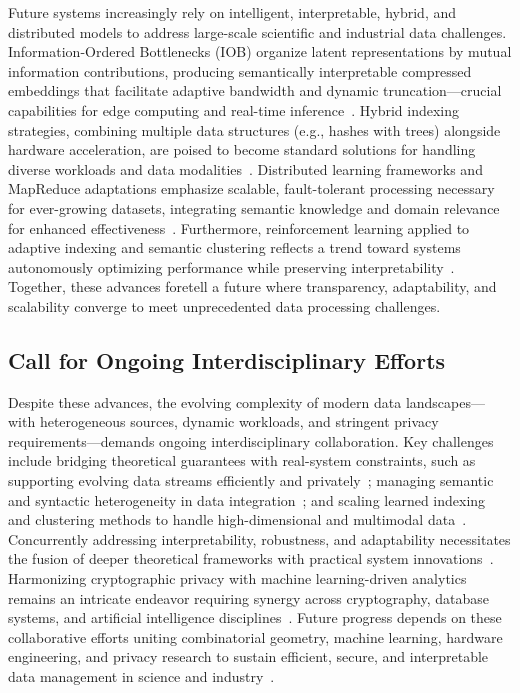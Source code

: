 \documentclass[11pt]{article}
\begin{document}
Future systems increasingly rely on intelligent, interpretable, hybrid, and distributed models to address large-scale scientific and industrial data challenges. Information-Ordered Bottlenecks (IOB) organize latent representations by mutual information contributions, producing semantically interpretable compressed embeddings that facilitate adaptive bandwidth and dynamic truncation—crucial capabilities for edge computing and real-time inference~\cite{ref22}. Hybrid indexing strategies, combining multiple data structures (e.g., hashes with trees) alongside hardware acceleration, are poised to become standard solutions for handling diverse workloads and data modalities~\cite{ref35,ref27}. Distributed learning frameworks and MapReduce adaptations emphasize scalable, fault-tolerant processing necessary for ever-growing datasets, integrating semantic knowledge and domain relevance for enhanced effectiveness~\cite{ref18,ref17}. Furthermore, reinforcement learning applied to adaptive indexing and semantic clustering reflects a trend toward systems autonomously optimizing performance while preserving interpretability~\cite{ref33,ref16}. Together, these advances foretell a future where transparency, adaptability, and scalability converge to meet unprecedented data processing challenges.

\subsection{Call for Ongoing Interdisciplinary Efforts}

Despite these advances, the evolving complexity of modern data landscapes—with heterogeneous sources, dynamic workloads, and stringent privacy requirements—demands ongoing interdisciplinary collaboration. Key challenges include bridging theoretical guarantees with real-system constraints, such as supporting evolving data streams efficiently and privately~\cite{ref8,ref31}; managing semantic and syntactic heterogeneity in data integration~\cite{ref17}; and scaling learned indexing and clustering methods to handle high-dimensional and multimodal data~\cite{ref30,ref16}. Concurrently addressing interpretability, robustness, and adaptability necessitates the fusion of deeper theoretical frameworks with practical system innovations~\cite{ref22,ref33}. Harmonizing cryptographic privacy with machine learning-driven analytics remains an intricate endeavor requiring synergy across cryptography, database systems, and artificial intelligence disciplines~\cite{ref23,ref28}. Future progress depends on these collaborative efforts uniting combinatorial geometry, machine learning, hardware engineering, and privacy research to sustain efficient, secure, and interpretable data management in science and industry~\cite{ref1,ref2,...,ref35}.
\end{document}

